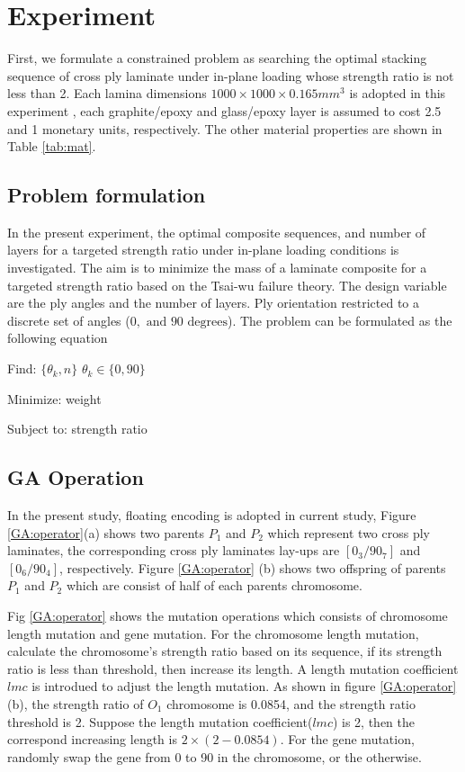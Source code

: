 \section{Experiment}
First, we formulate a constrained problem as searching the optimal stacking
sequence of cross ply laminate under in-plane loading whose strength ratio is
not less than 2.  Each lamina dimensions $1000 \times 1000 \times 0.165 mm^3$
is adopted in this experiment , each graphite/epoxy  and glass/epoxy layer is
assumed to cost 2.5 and 1 monetary units, respectively. The other material
properties are shown in Table \ref{tab:mat}. 



\subsection{Problem formulation}

In the present experiment, the optimal composite sequences, and number of
layers for a targeted strength ratio under in-plane loading conditions is
investigated.  The aim is to minimize the mass of a laminate composite for a
targeted strength ratio based on the Tsai-wu failure theory. The design
variable are the ply angles and the number of layers.  Ply orientation
restricted to a discrete set of angles ($0, \text{ and } 90 \text{ degrees} $).
The problem can be formulated as the following equation

Find: $\{\theta_k, n\}$ $\theta_k \in \{ 0,90\}$

Minimize: weight

Subject to: strength ratio


\subsection{GA Operation}


In the present study, floating encoding is adopted in current study, Figure
\ref{GA:operator}(a) shows two parents $P_1$ and $P_2$ which represent two
cross ply laminates, the corresponding cross ply laminates lay-ups are
$[0_3/90_7]$ and $[0_6/90_4]$, respectively. Figure \ref{GA:operator} (b) shows
two offspring of parents $P_1$ and $P_2$ which are consist of half of each
parents chromosome.

Fig \ref{GA:operator} shows the mutation operations which consists of
chromosome length mutation and gene mutation. For the chromosome length
mutation, calculate the chromosome's strength ratio based on its sequence, if
its strength ratio is less than threshold, then increase its length. A length
mutation coefficient $lmc$ is introdued to adjust the length mutation.  As
shown in figure \ref{GA:operator}(b), the strength ratio of $O_1$ chromosome is
0.0854, and the strength ratio threshold is 2. Suppose the length mutation
coefficient($lmc$) is 2, then the correspond increasing length is $2
\times(2-0.0854)$. For the gene mutation, randomly swap the gene from
0 to 90 in the chromosome, or the otherwise.


